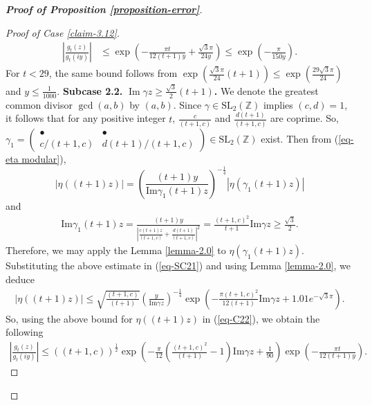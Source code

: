 \documentclass[11pt]{amsart}
\theoremstyle{plain}
\numberwithin{equation}{section}
\begin{document}
\begin{proof}[\textbf{\boldmath Proof of Proposition \ref{proposition-error}}]
\begin{proof}[Proof of Case \ref{claim-3.12}]
			\begin{align}\label{eq-C222}
				\left|\frac{g_{t}(z)}{g_t(iy)}\right|&\le \exp\left(-\frac{\pi t}{12(t+1)y}+\frac{\sqrt{3}\pi}{24y}\right)\le \exp\left(-\frac{\pi}{150y}\right).
			\end{align}
			For $t<29$, the same bound follows from $\exp\left(\frac{\sqrt{3}\pi}{24}(t+1)\right)\le \exp\left(\frac{29\sqrt{3}\pi}{24}\right)$ and $y\le \frac{1}{1000}$.
			\newline
			\textbf{Subcase 2.2.} \textbf{\boldmath $\operatorname{Im}\gamma z \ge \frac{\sqrt{3}}{2}(t+1)$.} 
			\newline
			We denote the greatest common divisor $\gcd(a,b)$ by $(a,b)$. Since $\gamma\in \text{SL}_2(\mathbb{Z})$ implies $(c,d)=1$, it follows that for any positive integer $t$, $\frac{c}{(t+1,c)}$ and $\frac{d(t+1)}{(t+1,c)}$ are coprime. 
			So, $\gamma_{1}=
			\begin{pmatrix}
				\bullet & \bullet\\
				c/(t+1,c) & d(t+1)/(t+1,c)
			\end{pmatrix}\in \text{SL}_2(\mathbb{Z})$ exist. Then from (\ref{eq-eta modular}), 
			\begin{equation}\label{eq-SC21}
				|\eta((t+1)z)|=\left(\frac{(t+1)y}{\text{Im}\gamma_1(t+1) z}\right)^{-\frac{1}{4}} |\eta(\gamma_{1}(t+1)z)| 
			\end{equation}
			and
			\begin{align*}
				\text{Im}\gamma_1(t+1)z=\frac{(t+1)y}{\left|\frac{c(t+1)z}{(t+1,c)}+\frac{d(t+1)}{(t+1,c)}\right|^{2}} =\frac{(t+1,c)^{2}}{t+1}\text{Im}\gamma z\ge \frac{\sqrt{3}}{2} .
			\end{align*}
			Therefore, we may apply the Lemma \ref{lemma-2.0} to $\eta(\gamma_{1}(t+1)z)$. 
			Substituting the above estimate in (\ref{eq-SC21}) and using Lemma \ref{lemma-2.0}, we deduce
			\begin{align*}
				|\eta((t+1)z)| \le \sqrt{\frac{(t+1,c)}{(t+1)}}\left(\frac{y}{\text{Im}\gamma z}\right)^{-\frac{1}{4}}\exp\left(-\frac{\pi(t+1,c)^{2}}{12(t+1)}\text{Im}\gamma z+1.01e^{-\sqrt{3}\pi}\right).
			\end{align*}
			So, using the above bound for $\eta((t+1)z)$ in (\ref{eq-C22}), we obtain the following
			\begin{align}\label{eq-SC24}
				\left|\frac{g_{t}(z)}{g_t(iy)}\right|\le ((t+1,c))^{\frac{1}{2}}\exp\left(-\frac{\pi}{12}\left(\frac{(t+1,c)^{2}}{(t+1)}-1\right)\text{Im}\gamma z+\frac{1}{90}\right)\exp\left(-\frac{\pi t}{12(t+1)y}\right).  

\end{align}
\end{proof}
\end{proof}
\end{document}
